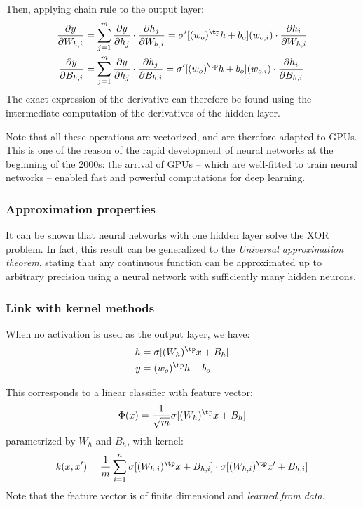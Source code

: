 \documentclass[toc, titlepaged]{../cs-classes/cs-classes}
\begin{document}
Then, applying chain rule to the output layer:
\begin{equation*}
    \begin{aligned}
        \frac{\partial y}{\partial W_{h, i}} &= \sum_{j=1}^m \frac{\partial y}{\partial h_j} \cdot \frac{\partial h_j}{\partial W_{h, i}} = \sigma'[(w_o)^\tp h + b_o](w_{o, i}) \cdot \frac{\partial h_i}{\partial W_{h, i}}\\
        \frac{\partial y}{\partial B_{h, i}} &= \sum_{j=1}^m \frac{\partial y}{\partial h_j} \cdot \frac{\partial h_j}{\partial B_{h, i}} = \sigma'[(w_o)^\tp h + b_o](w_{o, i}) \cdot \frac{\partial h_i}{\partial B_{h, i}}
    \end{aligned}
\end{equation*}
The exact expression of the derivative can therefore be found using the intermediate computation of the derivatives of the hidden layer.

Note that all these operations are vectorized, and are therefore adapted to GPUs. This is one of the reason of the rapid development of neural networks at the beginning of the 2000s: the arrival of GPUs -- which are well-fitted to train neural networks -- enabled fast and powerful computations for deep learning.

\subsubsection{Approximation properties}
It can be shown that neural networks with one hidden layer solve the XOR problem. In fact, this result can be generalized to the \emph{Universal approximation theorem}, stating that any continuous function can be approximated up to arbitrary precision using a neural network with sufficiently many hidden neurons.

\subsubsection{Link with kernel methods}
When no activation is used as the output layer, we have:
\begin{equation*}
    \begin{aligned}
        h &= \sigma[(W_h)^\tp x+B_h]\\
        y &= (w_o)^\tp h + b_o
    \end{aligned}
\end{equation*}

This corresponds to a linear classifier with feature vector:
\begin{equation*}
    \Phi(x) = \frac{1}{\sqrt{m}}\sigma[(W_h)^\tp x + B_h]
\end{equation*}
parametrized by $W_h$ and $B_h$, with kernel:
\begin{equation*}
    k(x, x') = \frac{1}{m}\sum_{i=1}^n \sigma[(W_{h, i})^\tp x+B_{h, i}] \cdot \sigma[(W_{h, i})^\tp x' + B_{h, i}]
\end{equation*}
Note that the feature vector is of finite dimensiond and \emph{learned from data}.
\end{document}
